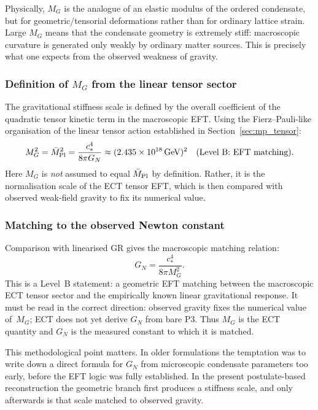 \documentclass[11pt,a4paper]{article}
\numberwithin{equation}{section}
\begin{document}
Physically, $M_G$ is the analogue of an elastic modulus of the ordered
condensate, but for geometric/tensorial deformations rather than for
ordinary lattice strain.
Large $M_G$ means that the condensate geometry is extremely stiff:
macroscopic curvature is generated only weakly by ordinary matter sources.
This is precisely what one expects from the observed weakness of gravity.

\subsubsection*{Definition of $M_G$ from the linear tensor sector}

The gravitational stiffness scale is defined by the overall coefficient
of the quadratic tensor kinetic term in the macroscopic EFT.
Using the Fierz--Pauli-like organisation of the linear tensor action
established in Section~\ref{sec:mp_tensor}:
\begin{equation}
  \label{eq:MG_def}
  M_G^2 = \bar M_{\rm Pl}^2
  = \frac{c_*^4}{8\pi G_N}
  \approx (2.435\times 10^{18}\,\text{GeV})^2
  \quad\text{(Level~B: EFT matching)}.
\end{equation}
Here $M_G$ is \emph{not} assumed to equal $\bar M_{\rm Pl}$ by definition.
Rather, it is the normalisation scale of the ECT tensor EFT, which is
then compared with observed weak-field gravity to fix its numerical value.

\subsubsection*{Matching to the observed Newton constant}

Comparison with linearised GR gives the macroscopic matching relation:
\begin{equation}
  \label{eq:GN_from_MG}
  G_N = \frac{c_*^4}{8\pi M_G^2}.
\end{equation}
This is a Level~B statement: a geometric EFT matching between the
macroscopic ECT tensor sector and the empirically known linear
gravitational response.
It must be read in the correct direction: observed gravity fixes the
numerical value of~$M_G$; ECT does not yet derive $G_N$ from bare P3.
Thus $M_G$ is the ECT quantity and $G_N$ is the measured constant
to which it is matched.

This methodological point matters.
In older formulations the temptation was to write down a direct formula
for $G_N$ from microscopic condensate parameters too early, before the
EFT logic was fully established.
In the present postulate-based reconstruction the geometric branch first
produces a stiffness scale, and only afterwards is that scale matched
to observed gravity.
\end{document}
